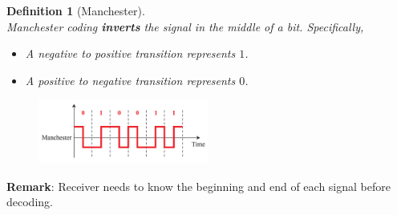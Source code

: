 \documentclass[12pt]{article}
\newtheorem{definition}{Definition}[section]
\theoremstyle{definition}
\begin{document}
\begin{definition}[Manchester]
\hfill\\\normalfont Manchester coding \textbf{inverts} the signal in the \textit{middle} of a bit. Specifically, 
\begin{itemize}
  \item A \textit{negative} to \textit{positive} transition represents $1$.
  \item A \textit{positive} to \textit{negative} transition represents $0$.
\end{itemize}
\begin{figure}[h]
\centering
\includegraphics[width = 0.5\textwidth]{10_1_3.png}
\end{figure}
\end{definition}
\textbf{Remark}: Receiver needs to know the beginning and end of each signal before decoding.
\end{document}
